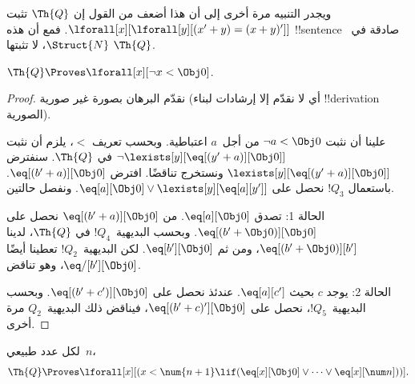 \documentclass[../../../include/open-logic-section]{subfiles}
\begin{document}
ويجدر التنبيه مرة أخرى إلى أن هذا أضعف من القول إن $\Th{Q}$ تثبت
$\lforall[x][\lforall[y][(x'+y)=(x+y)']]$. فمع أن هذه
!!{sentence} صادقة في~$\Struct{N}$، لا تثبتها $\Th{Q}$.

\begin{lem}
$\Th{Q} \Proves \lforall[x][\lnot x < \Obj 0]$.
\end{lem}

\begin{proof}
نقدّم البرهان بصورة غير صورية (أي لا نقدّم إلا إرشادات لبناء
!!{derivation} الصورية).

علينا أن نثبت $\lnot a<\Obj 0$ من أجل~$a$ اعتباطية. وبحسب تعريف
$<$، يلزم أن نثبت
$\lnot\lexists[y][\eq[(y'+a)][\Obj 0]]$ في $\Th{Q}$. سنفترض
$\lexists[y][\eq[(y'+a)][\Obj 0]]$ ونستخرج تناقضًا. افترض
$\eq[(b'+a)][\Obj 0]$. باستعمال $!Q_3$ نحصل على
$\eq[a][\Obj 0]\lor\lexists[y][\eq[a][y']]$. ونفصل حالتين.

الحالة 1: تصدق $\eq[a][\Obj 0]$. من $\eq[(b'+a)][\Obj 0]$ نحصل
على $\eq[(b'+\Obj 0)][\Obj 0]$. وبحسب البديهية~$!Q_4$ في
$\Th{Q}$، لدينا $\eq[(b'+\Obj 0)][b']$، ومن ثم
$\eq[b'][\Obj 0]$. لكن البديهية~$!Q_2$ تعطينا أيضًا
$\eq/[b'][\Obj 0]$، وهو تناقض.

الحالة 2: يوجد $c$ بحيث $\eq[a][c']$. عندئذ نحصل على
$\eq[(b'+c')][\Obj 0]$. وبحسب البديهية~$!Q_5$، نحصل على
$\eq[(b'+c)'][\Obj 0]$، فيناقض ذلك البديهية~$Q_2$ مرة أخرى.
\end{proof}

\begin{lem}
لكل عدد طبيعي~$n$،
  \[
  \Th{Q} \Proves
  \lforall[x][(x < \num {n+1} \lif (\eq[x][\Obj 0] \lor \dots \lor
    \eq[x][\num n]))].
  \]
\end{lem}
\end{document}
